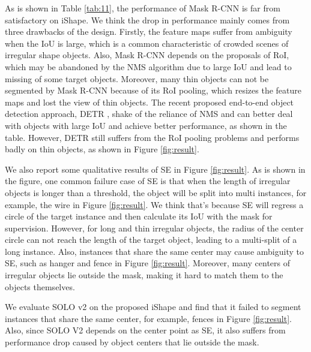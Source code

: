As is shown in Table \ref{tab:11}, the performance of Mask R-CNN \cite{maskrcnn} is far from satisfactory on iShape. We think the drop in performance mainly comes from three drawbacks of the design. Firstly, the feature maps suffer from ambiguity when the IoU is large, which is a common characteristic of crowded scenes of irregular shape objects. Also, Mask R-CNN depends on the proposals of RoI, which may be abandoned by the NMS algorithm due to large IoU and lead to missing of some target objects.  Moreover, many thin objects can not be segmented by Mask R-CNN because of its RoI pooling, which resizes the feature maps and lost the view of thin objects. The recent proposed end-to-end object detection approach, DETR \cite{carion2020endtoend}, shake of the reliance of NMS and can better deal with objects with large IoU and achieve better performance, as shown in the table. However, DETR still suffers from the RoI pooling problems and performs badly on thin objects, as shown in Figure \ref{fig:result}.

We also report some qualitative results of SE \cite{neven2019instance} in Figure \ref{fig:result}. As is shown in the figure, one common failure case of SE is that when the length of irregular objects is longer than a threshold, the object will be split into multi instances,  for example, the wire in Figure \ref{fig:result}. We think that's because SE will regress a circle of the target instance and then calculate its IoU with the mask for supervision. However, for long and thin irregular objects, the radius of the center circle can not reach the length of the target object, leading to a multi-split of a long instance. Also, instances that share the same center may cause ambiguity to SE, such as hanger and fence in Figure \ref{fig:result}. Moreover, many centers of irregular objects lie outside the mask, making it hard to match them to the objects themselves. 

We evaluate SOLO v2 \cite{wang2020solov2} on the proposed iShape and find that it failed to segment instances that share the same center, for example, fences in Figure \ref{fig:result}. Also, since SOLO V2 depends on the center point as SE, it also suffers from performance drop caused by object centers that lie outside the mask. 


